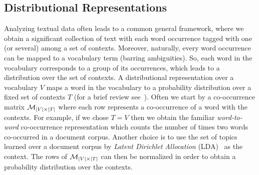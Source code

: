 \subsection{Distributional Representations}
\label{sec:distributional-representations}
Analyzing textual data often leads to a common general framework,
where we obtain a significant collection of text with each word
occurrence tagged with one (or several) among a set of
contexts. Moreover, naturally, every word occurrence can be mapped to a
vocabulary term (barring ambiguities). So, each word in the vocabulary
corresponds to a group of its occurrences, which leads to a
distribution over the set of contexts. A distributional representation
over a vocabulary $V$ maps a word in the vocabulary to a  
probability distribution over a fixed set of contexts $T$  (for a brief review
see~\cite{Turian10wordrepresentations}). Often we start by a
co-occurrence matrix ${\mathcal M}_{|V|\times|T|}$ where each row represents a
co-occurrence of a word with the contexts.
For example, if we chose $T=V$ then we obtain the familiar {\sl
  word-to-word} co-occurrence representation which counts the number 
of times two words co-occurred in a document corpus. Another choice is
to use the set of topics learned over a document 
corpus by {\sl Latent Dirichlet Allocation}
(LDA)~\cite{Blei:2003:LDA:944919.944937} as the context. The rows of
${\mathcal M}_{|V|\times|T|}$ 
can then  be normalized in order to obtain a probability distribution over
the contexts.



